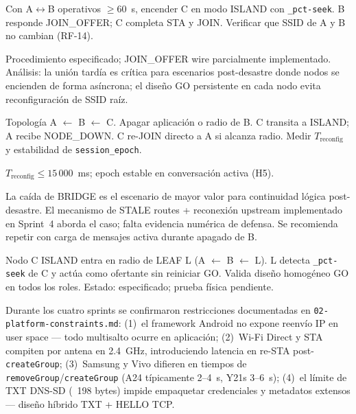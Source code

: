 

Con A$\leftrightarrow$B operativos $\geq 60$~s, encender C en modo ISLAND con \texttt{\_pct-seek}. B responde JOIN\_OFFER; C completa STA y JOIN. Verificar que SSID de A y B no cambian (RF-14).


Procedimiento especificado; JOIN\_OFFER wire parcialmente implementado. Análisis: la unión tardía es crítica para escenarios post-desastre donde nodos se encienden de forma asíncrona; el diseño GO persistente en cada nodo evita reconfiguración de SSID raíz.



Topología A $\leftarrow$ B $\leftarrow$ C. Apagar aplicación o radio de B. C transita a ISLAND; A recibe NODE\_DOWN. C re-JOIN directo a A si alcanza radio. Medir $T_{\mathrm{reconfig}}$ y estabilidad de \texttt{session\_epoch}.


$T_{\mathrm{reconfig}} \leq 15\,000$~ms; epoch estable en conversación activa (H5).


La caída de BRIDGE es el escenario de mayor valor para continuidad lógica post-desastre. El mecanismo de STALE routes + reconexión upstream implementado en Sprint~4 aborda el caso; falta evidencia numérica de defensa. Se recomienda repetir con carga de mensajes activa durante apagado de B.


Nodo C ISLAND entra en radio de LEAF L (A $\leftarrow$ B $\leftarrow$ L). L detecta \texttt{\_pct-seek} de C y actúa como ofertante sin reiniciar GO. Valida diseño homogéneo GO en todos los roles. Estado: especificado; prueba física pendiente.


Durante los cuatro sprints se confirmaron restricciones documentadas en \texttt{02-platform-constraints.md}: (1)~el framework Android no expone reenvío IP en user space — todo multisalto ocurre en aplicación; (2)~Wi-Fi Direct y STA compiten por antena en 2.4~GHz, introduciendo latencia en re-STA post-\texttt{createGroup}; (3)~Samsung y Vivo difieren en tiempos de \texttt{removeGroup}/\texttt{createGroup} (A24 típicamente 2--4~s, Y21s 3--6~s); (4)~el límite de TXT DNS-SD (~198 bytes) impide empaquetar credenciales y metadatos extensos — diseño híbrido TXT + HELLO TCP.


